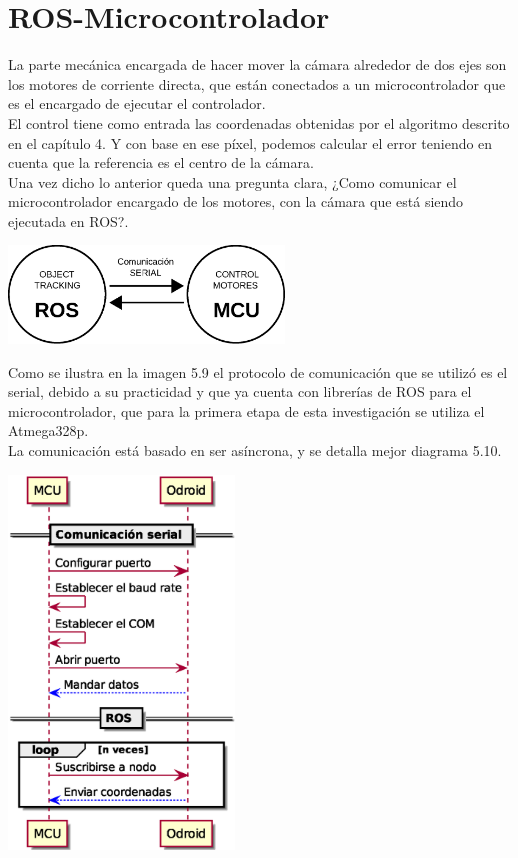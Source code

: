 \section{ROS-Microcontrolador}
La parte mecánica encargada de hacer mover la cámara alrededor de dos ejes son los motores de corriente directa, que están conectados
a un microcontrolador que es el encargado de ejecutar el controlador.\\
El control tiene como entrada las coordenadas obtenidas por el algoritmo descrito en el capítulo 4. Y con base en ese píxel, podemos
calcular el error teniendo en cuenta que la referencia es el centro de la cámara.\\
Una vez dicho lo anterior queda una pregunta clara, ¿Como comunicar el microcontrolador encargado de los motores, con la cámara que
está siendo ejecutada en ROS?.
\begin{center}
	\includegraphics[width=0.55\textwidth]{Contenido/Cuerpo/Capitulo5/Fig1.eps}
	\label{Fig2}
\end{center}
Como se ilustra en la imagen 5.9 el protocolo de comunicación que se utilizó es el serial, debido a su practicidad y que ya
cuenta con librerías de ROS para el microcontrolador, que para la primera etapa de esta investigación se utiliza el Atmega328p.\\
La comunicación está basado en ser asíncrona, y se detalla mejor diagrama 5.10.
\begin{center}
	\includegraphics[width=0.45\textwidth]{Contenido/Cuerpo/Capitulo5/Fig2.eps}
	\label{Fig3}
\end{center}
